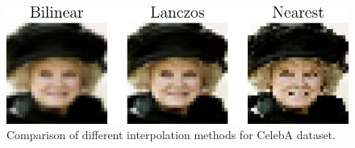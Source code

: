 {%
\begin{figure}[t]
    \centering
    \includegraphics[scale=0.5]{graphics/paper_modelagnostic/celeba_difference_correct_font.pdf}
    \caption{Comparison of different interpolation methods for CelebA dataset.}
    \label{fig_modelagnostic:celeba}
\end{figure}

}
